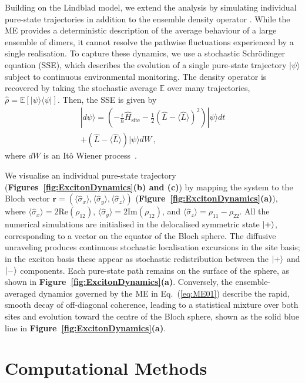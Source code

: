\documentclass[journal=jpcbfk, manuscript=article, layout=twocolumn, doi=true]{achemso}
\begin{document}
Building on the Lindblad model, we extend the analysis by simulating individual pure-state trajectories in addition to the ensemble density operator \cite{abrahams2025excitonic}. While the ME provides a deterministic description of the average behaviour of a large ensemble of dimers, it cannot resolve the pathwise fluctuations experienced by a single realisation. To capture these dynamics, we use a stochastic Schrödinger equation (SSE), which describes the evolution of a single pure-state trajectory $|\psi\rangle$ subject to continuous environmental monitoring. The density operator is recovered by taking the stochastic average $\mathbb{E}$ over many trajectories, $\hat{\rho} = \mathbb{E}[|\psi\rangle\langle\psi|]$. Then, the SSE is given by
\begin{multline}
    |d\psi\rangle = \left( -\frac{i}{\hbar}\hat{H}_{\text{site}} - \frac{1}{2}(\hat{L} - \langle \hat{L} \rangle)^2 \right) |\psi\rangle dt \\
    + (\hat{L} - \langle \hat{L} \rangle) |\psi\rangle dW \, ,
\end{multline}
where $dW$ is an It\^{o} Wiener process~\cite{petruccione}.

We visualise an individual pure-state trajectory (\textbf{Figures~\ref{fig:ExcitonDynamics}(b) and (c)}) by mapping the system to the Bloch vector $\mathbf{r} = (\langle\hat\sigma_x\rangle, \langle\hat\sigma_y\rangle, \langle\hat\sigma_z\rangle)$ (\textbf{Figure~\ref{fig:ExcitonDynamics}(a)}), where $\langle\hat\sigma_x\rangle = 2\text{Re}(\rho_{12})$, $\langle\hat\sigma_y\rangle = 2\text{Im}(\rho_{12})$, and $\langle\hat\sigma_z\rangle = \rho_{11} - \rho_{22}$. All the numerical simulations are initialised in the delocalised symmetric state $\ket{+}$, corresponding to a vector on the equator of the Bloch sphere. The diffusive unraveling produces continuous stochastic localisation excursions in the site basis; in the exciton basis these appear as stochastic redistribution between the $\ket{+}$ and $\ket{-}$ components. Each pure-state path remains on the surface of the sphere, as shown in \textbf{Figure~\ref{fig:ExcitonDynamics}(a)}. Conversely, the ensemble-averaged dynamics governed by the ME in Eq.~(\ref{eq:ME01}) describe the rapid, smooth decay of off-diagonal coherence, leading to a statistical mixture over both sites and evolution toward the centre of the Bloch sphere, shown as the solid blue line in \textbf{Figure~\ref{fig:ExcitonDynamics}(a)}.

\section{Computational Methods}
\end{document}
